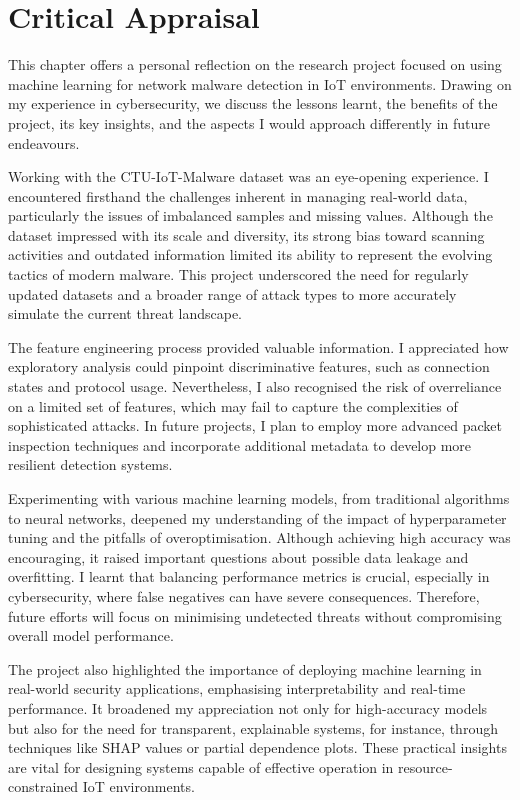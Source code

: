 \chapter{Critical Appraisal}

This chapter offers a personal reflection on the research project focused on using machine learning for network malware detection in IoT environments. Drawing on my experience in cybersecurity, we discuss the lessons learnt, the benefits of the project, its key insights, and the aspects I would approach differently in future endeavours.

Working with the CTU-IoT-Malware dataset was an eye-opening experience. I encountered firsthand the challenges inherent in managing real-world data, particularly the issues of imbalanced samples and missing values. Although the dataset impressed with its scale and diversity, its strong bias toward scanning activities and outdated information limited its ability to represent the evolving tactics of modern malware. This project underscored the need for regularly updated datasets and a broader range of attack types to more accurately simulate the current threat landscape.

The feature engineering process provided valuable information. I appreciated how exploratory analysis could pinpoint discriminative features, such as connection states and protocol usage. Nevertheless, I also recognised the risk of overreliance on a limited set of features, which may fail to capture the complexities of sophisticated attacks. In future projects, I plan to employ more advanced packet inspection techniques and incorporate additional metadata to develop more resilient detection systems.

Experimenting with various machine learning models, from traditional algorithms to neural networks, deepened my understanding of the impact of hyperparameter tuning and the pitfalls of overoptimisation. Although achieving high accuracy was encouraging, it raised important questions about possible data leakage and overfitting. I learnt that balancing performance metrics is crucial, especially in cybersecurity, where false negatives can have severe consequences. Therefore, future efforts will focus on minimising undetected threats without compromising overall model performance.

The project also highlighted the importance of deploying machine learning in real-world security applications, emphasising interpretability and real-time performance. It broadened my appreciation not only for high-accuracy models but also for the need for transparent, explainable systems, for instance, through techniques like SHAP values or partial dependence plots. These practical insights are vital for designing systems capable of effective operation in resource-constrained IoT environments.

